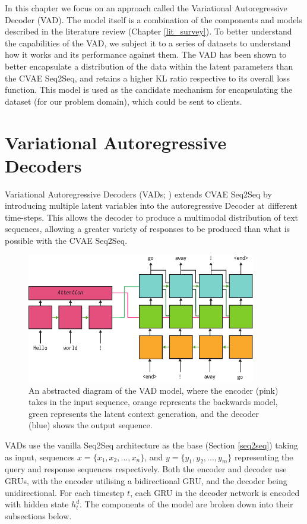 \documentclass[12pt,twoside]{report}
\begin{document}
In this chapter we focus on an approach called the Variational Autoregressive Decoder (VAD). The model itself is a combination of the components and models described in the literature review (Chapter \ref{lit_survey}). To better understand the capabilities of the VAD, we subject it to a series of datasets to understand how it works and its performance against them. The VAD has been shown to better encapsulate a distribution of the data within the latent parameters than the CVAE Seq2Seq, and retains a higher KL ratio respective to its overall loss function. This model is used as the candidate mechanism for encapsulating the dataset (for our problem domain), which could be sent to clients.

\section{Variational Autoregressive Decoders}

Variational Autoregressive Decoders (VADs; \cite{du_variational_2018}) extends CVAE Seq2Seq by introducing multiple latent variables into the autoregressive Decoder at different time-steps. This allows the decoder to produce a multimodal distribution of text sequences, allowing a greater variety of responses to be produced than what is possible with the CVAE Seq2Seq.

\begin{figure}[!ht]
		
	\centering
	\includegraphics[width=100mm]{diagrams/vad.pdf}
	\caption{An abstracted diagram of the VAD model, where the encoder (pink) takes in the input sequence, orange represents the backwards model, green represents the latent context generation, and the decoder (blue) shows the output sequence.\label{vad_abstract}}
	\end{figure}

VADs use the vanilla Seq2Seq architecture as the base (Section \ref{seq2seq}) taking as input, sequences $x = \{x_1, x_2, ..., x_n\}$, and $y = \{y_1, y_2, ..., y_m\}$ representing the query and response sequences respectively. Both the encoder and decoder use GRUs, with the encoder utilising a bidirectional GRU, and the decoder being unidirectional. For each timestep $t$, each GRU in the decoder network is encoded with hidden state $h^d_t$. The components of the model are broken down into their subsections below.
\end{document}
